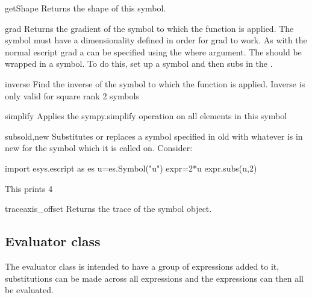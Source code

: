 \begin{methoddesc}[Symbol]{getShape}{}
Returns the shape of this symbol.
\end{methoddesc}
\pagebreak
\begin{methoddesc}[Symbol]{grad}{}
Returns the gradient of the symbol to which the function is applied. The symbol must have a dimensionality defined in order for grad to work. As with the normal escript grad a \FunctionSpace can be specified using the where argument. The \FunctionSpace should be wrapped in a symbol. To do this, set up a symbol and then subs in the \FunctionSpace.
\end{methoddesc}
\begin{methoddesc}[Symbol]{inverse}{}
Find the inverse of the symbol to which the function is applied. Inverse is only valid for square rank 2 symbols
\end{methoddesc}
\begin{methoddesc}[Symbol]{simplify}{}
Applies the sympy.simplify operation on all elements in this symbol
\end{methoddesc}
\begin{methoddesc}[Symbol]{subs}{old,new}
Substitutes or replaces a symbol specified in old with whatever is in new for the symbol which it is called on. Consider:
  \begin{python}
     import esys.escript as es
     u=es.Symbol("u")
     expr=2*u
     expr.subs(u,2)
\end{python}
This prints 4
\end{methoddesc}
\begin{methoddesc}[Symbol]{trace}{axis_offset}
Returns the trace of the symbol object.
\end{methoddesc}


\subsection{Evaluator class}
The evaluator class is intended to have a group of expressions added to it, substitutions can be made across all expressions and the expressions can then all be evaluated.

